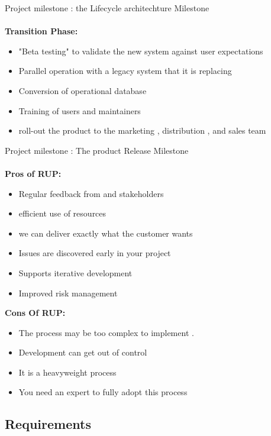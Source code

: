 \documentclass[
	11pt,
	a4paper
]{article}%
\begin{document}
Project milestone : the Lifecycle architechture Milestone
\\\\
\textbf{Transition Phase:}
\begin{itemize}
\item "Beta testing" to validate the new system against user expectations 
\item Parallel operation with a legacy system that it is replacing 
\item Conversion of operational database
\item Training of users and maintainers 
\item roll-out the product to the marketing , distribution , and sales team 
\end{itemize}
Project milestone : The product Release Milestone
\\\\
\textbf{Pros of RUP:}
\begin{itemize}
\item Regular feedback from and stakeholders
\item efficient use of resources
\item we can deliver exactly what the customer wants
\item Issues are discovered early in your project
\item Supports iterative development
\item Improved risk management
\end{itemize}\textbf{Cons Of RUP:}
\begin{itemize}
\item The process may be too complex to implement .
\item Development can get out of control
\item It is a heavyweight process
\item You need an expert to fully adopt this process
\end{itemize}


\subsection{Requirements}
\end{document}
